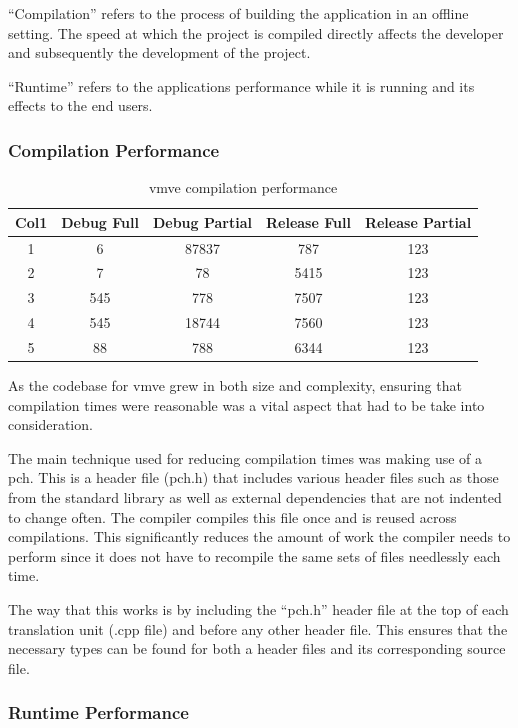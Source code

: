 \documentclass[11pt]{article}
\begin{document}
``Compilation'' refers to the process of building the application in an offline
setting. The speed at which the project is compiled directly affects the
developer and subsequently the development of the project.

``Runtime'' refers to the applications performance while it is running and its
effects to the end users.


\subsubsection{Compilation Performance}

\begin{table}[h!]
\centering
\begin{tabular}{||c c c c c ||} 
  \hline
  Col1 & Debug Full & Debug Partial  & Release Full & Release Partial \\ [0.5ex] 
  \hline\hline
  1 & 6 & 87837 & 787 & 123 \\ 
  2 & 7 & 78 & 5415 & 123 \\
  3 & 545 & 778 & 7507 & 123 \\
  4 & 545 & 18744 & 7560 & 123  \\
  5 & 88 & 788 & 6344 & 123 \\ [1ex] 
  \hline
\end{tabular}
\caption{\gls{vmve} compilation performance}
\label{fig:compilation_performance}
\end{table}

As the codebase for \gls{vmve} grew in both size and complexity, ensuring that
compilation times were reasonable was a vital aspect that had to be take into
consideration.

The main technique used for reducing compilation times was making use of a
\gls{pch}. This is a header file (pch.h) that includes various header files such
as those from the standard library as well as external dependencies that are not
indented to change often. The compiler compiles this file once and is reused
across compilations. This significantly reduces the amount of work the compiler
needs to perform since it does not have to recompile the same sets of files
needlessly each time.

The way that this works is by including the ``pch.h'' header file at the top of
each translation unit (.cpp file) and before any other header file. This ensures
that the necessary types can be found for both a header files and its
corresponding source file.

\subsubsection{Runtime Performance}
\end{document}
